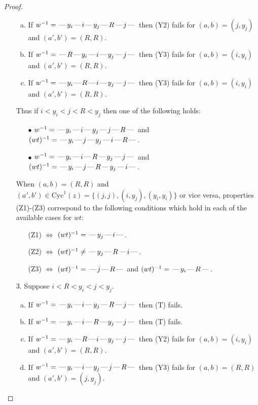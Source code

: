 \documentclass[10pt]{article}
\theoremstyle{definition}
\theoremstyle{definition}
\def\dash{\text{\hspace{0.5mm}---\hspace{0.5mm}}}
\def\Cyc{\mathrm{Cyc}}
\begin{document}
\begin{proof}
\begin{enumerate}
\begin{enumerate}[(a)]
\item If $w^{-1} = \dash y_i\dash i\dash y_j\dash R\dash j\dash $ then (Y2) fails for $(a,b)=(j,y_j)$ and $(a',b')=(R,R)$.
\item If $w^{-1} = \dash R\dash y_i\dash i\dash y_j\dash j\dash $ then (Y3) fails for $(a,b)=(i,y_i)$ and $(a',b')=(R,R)$.
\item If $w^{-1} = \dash y_i\dash R\dash i\dash y_j\dash j\dash $ then (Y3) fails for $(a,b)=(i,y_i)$ and $(a',b')=(R,R)$.
\end{enumerate}
Thus if $i < y_i < j < R < y_j$ then one of the following holds:
\begin{enumerate}
\item[$\bullet$] $w^{-1} = \dash y_i\dash i\dash y_j\dash j\dash R\dash $ and $(wt)^{-1} = \dash y_i\dash j\dash y_j\dash i\dash R\dash $.
\item[$\bullet$] $w^{-1} = \dash y_i\dash i\dash R\dash y_j\dash j\dash $ and $(wt)^{-1} = \dash y_i\dash j\dash R\dash y_j\dash i\dash $.
\end{enumerate}
When $(a,b)= (R,R)$ and $(a',b')\in \Cyc^1(z)=\{(j,j),(i,y_j),(y_i,y_i)\}$ or vice versa,
properties (Z1)-(Z3) correspond to the following conditions which
hold in each of the available cases for $wt$:
\begin{enumerate}
\item[](Z1) $\Leftrightarrow$ $(wt)^{-1} = \dash y_j \dash i \dash$.
\item[](Z2) $\Leftrightarrow$ $(wt)^{-1} \neq \dash y_j \dash R \dash i \dash$.
\item[](Z3) $\Leftrightarrow$ $(wt)^{-1} = \dash j \dash R \dash$  and $(wt)^{-1} = \dash y_i \dash R \dash$.
\end{enumerate}
\item[$3$.] Suppose $i < R < y_i < j < y_j$.
\begin{enumerate}[(a)]
\item If $w^{-1} = \dash y_i\dash i\dash y_j\dash R\dash j\dash $ then (T) fails.
\item If $w^{-1} = \dash y_i\dash i\dash R\dash y_j\dash j\dash $ then (T) fails.
\item If $w^{-1} = \dash y_i\dash R\dash i\dash y_j\dash j\dash $ then (Y2) fails for $(a,b)=(i,y_i)$ and $(a',b')=(R,R)$.
\item If $w^{-1} = \dash y_i\dash i\dash y_j\dash j\dash R\dash $ then (Y3) fails for $(a,b)=(R,R)$ and $(a',b')=(j,y_j)$.
\end{enumerate}

\end{enumerate}
\end{proof}
\end{document}
